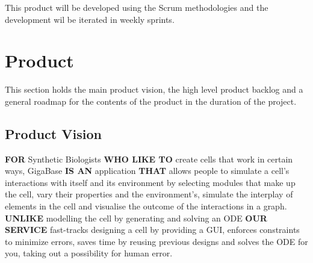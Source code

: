 \documentclass[10pt,a4paper]{report}
\begin{document}
This product will be developed using the Scrum methodologies and the development wil be iterated in weekly sprints.

	\clearpage

	\section{Product}
		This section holds the main product vision, the high level product backlog and a general roadmap for the contents of the product in the duration of the project.
		\subsection{Product Vision}
			\textbf{FOR} Synthetic Biologists \textbf{WHO LIKE TO} create cells that work in certain ways, GigaBase \textbf{IS AN} application \textbf{THAT} allows people to simulate a cell's interactions with itself and its environment by selecting modules that make up the cell, vary their properties and the environment’s, simulate the interplay of elements in the cell and visualise the outcome of the interactions in a graph. \textbf{UNLIKE} modelling the cell by generating and solving an ODE \textbf{OUR SERVICE} fast-tracks designing a cell by providing a GUI, enforces constraints to minimize errors, saves time by reusing previous designs and solves the ODE for you, taking out a possibility for human error.
\end{document}
